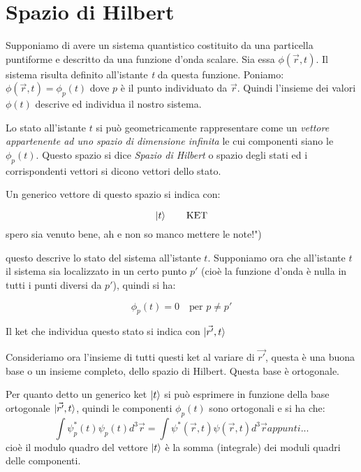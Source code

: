 \section{Spazio di Hilbert}

Supponiamo 
di avere un sistema quantistico costituito da una particella puntiforme e
descritto da una funzione d'onda scalare.
Sia essa $\phi(\vec{r},t)$. Il sistema risulta definito all'istante \textit{t}
da questa funzione. Poniamo:
$\phi(\vec{r},t) =\phi_{p}(t)$
dove $p$ è il punto individuato da $\vec{r}$. Quindi l'insieme dei valori
${\phi(t)}$ descrive ed individua il nostro sistema.

Lo stato all'istante $t$ si può geometricamente rappresentare come un
\textit{vettore appartenente ad uno spazio di dimensione infinita} le cui
componenti siano le $\phi_{p}(t)$. Questo spazio si dice \textit{Spazio di
Hilbert} o spazio degli stati ed i corrispondenti vettori si dicono vettori
dello stato.

Un generico vettore di questo spazio si indica con:

\begin{equation}
 \ket{t}  \qquad \text{KET}
\end{equation}%
spero sia venuto bene, ah e non so manco mettere le note!")

questo descrive lo stato del sistema all'istante $t$.
Supponiamo ora che all'istante $t$ il sistema sia localizzato in un certo punto
$p'$ (cioè la funzione d'onda è nulla in tutti i punti diversi da $p'$), 
quindi
si ha:

\[
\phi_{p}(t)=0 \quad \text{per } p\neq p'
\]

Il ket che individua questo stato si indica con 
$\ket{\vec{r'},t}$

Consideriamo ora l'insieme di tutti questi ket al variare di $\vec{r'}$, questa
è una buona base o un insieme completo, dello spazio di Hilbert. Questa base è
ortogonale.

Per quanto detto un generico ket $\ket{t}$ si può esprimere in funzione della
base ortogonale $\ket{\vec{r'},t}$, quindi le componenti $\phi_{p}(t)$  sono
ortogonali e si ha che:
\begin{equation}
\int \psi^*_{p}(t)\psi_{p}(t) d^3\vec{r}= \int 
\psi^*(\vec{r},t)\psi(\vec{r},t)d^3\vec{r}%
appunti...
\end{equation}
cioè il modulo quadro del vettore $\ket{t}$ è la somma (integrale) dei moduli
quadri delle componenti.

